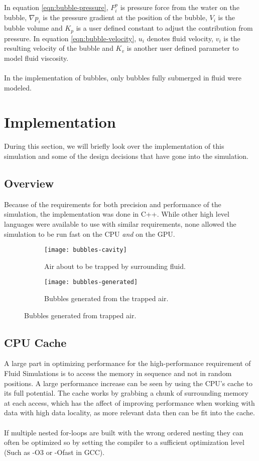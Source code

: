 \documentclass[twocolumn]{article}
\begin{document}
In equation \ref{eqn:bubble-pressure}, $F^p_i$ is pressure force from the water on the bubble, $\nabla p_i$ is the pressure gradient at the position of the bubble, $V_i$ is the bubble volume and $K_p$ is a user defined constant to adjust the contribution from pressure. In equation \ref{eqn:bubble-velocity}, $u_i$ denotes fluid velocity, $v_i$ is the resulting velocity of the bubble and $K_v$ is another user defined parameter to model fluid viscosity.
\\\\
In the implementation of bubbles, only bubbles fully submerged in fluid were modeled.

\section{Implementation}
During this section, we will briefly look over the implementation of this simulation and some of the design decisions that have gone into the simulation.
\subsection{Overview}
Because of the requirements for both precision and performance of the simulation, the implementation was done in C++. While other high level languages were available to use with similar requirements, none allowed the simulation to be run fast on the CPU \emph{and} on the GPU. 

\begin{figure*}
  \centering
    \begin{subfigure}[b]{.4\textwidth}
        \centering
        \texttt{[image: bubbles-cavity]}
        \caption{Air about to be trapped by surrounding fluid.}
        \label{fig:bubbles-cavity}
    \end{subfigure}
    \begin{subfigure}[b]{.4\textwidth}
        \centering
        \texttt{[image: bubbles-generated]}
        \caption{Bubbles generated from the trapped air.}
        \label{fig:bubbles-generated}
    \end{subfigure}
    \caption{Bubbles generated from trapped air.}\label{fig:bubble-combined}
\end{figure*}

\subsection{CPU Cache}
A large part in optimizing performance for the high-performance requirement of Fluid Simulations is to access the memory in sequence and not in random positions. A large performance increase can be seen by using the CPU's cache to its full potential.
The cache works by grabbing a chunk of surrounding memory at each access, which has the affect of improving performance when working with data with high data locality, as more relevant data then can be fit into the cache. 
\\\\
If multiple nested for-loops are built with the wrong ordered nesting they can often be optimized so by setting the compiler to a sufficient optimization level (Such as -O3 or -Ofast in GCC).
\end{document}

